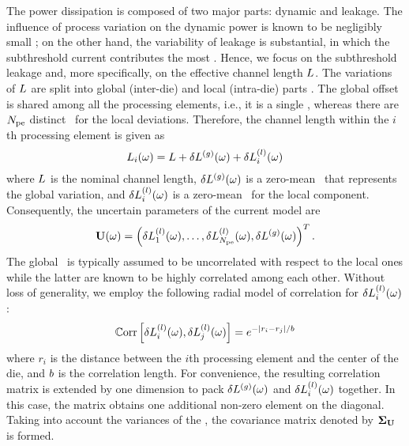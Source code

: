 The power dissipation is composed of two major parts: dynamic and leakage. The influence of process variation on the dynamic power is known to be negligibly small \cite{juan2011, juan2012, srivastava2010}; on the other hand, the variability of leakage is substantial, in which the subthreshold current contributes the most \cite{juan2011, juan2012}. Hence, we focus on the subthreshold leakage and, more specifically, on the effective channel length $L$. The variations of $L$ are split into global (inter-die) and local (intra-die) parts \cite{chandra2010, juan2011, juan2012, srivastava2010, shen2009}. The global offset is shared among all the processing elements, i.e., it is a single \rv, whereas there are ${N_\text{pe}}$ distinct \rvs\ for the local deviations. Therefore, the channel length within the $i$th processing element is given as
\[
  L_i(\omega) = L + {\delta L^{(g)}}(\omega) + \delta L^{(l)}_i(\omega)
\]
where $L$ is the nominal channel length, ${\delta L^{(g)}}(\omega)$ is a zero-mean \rv\ that represents the global variation, and $\delta L^{(l)}_i(\omega)$ is a zero-mean \rv\ for the local component. Consequently, the uncertain parameters of the current model are
\[
  \mathbf{U}(\omega) = \left(\delta L^{(l)}_1(\omega), \dotsc, \delta L^{(l)}_{N_\text{pe}}(\omega), {\delta L^{(g)}}(\omega) \right)^T.
\]
The global \rv\ is typically assumed to be uncorrelated with respect to the local ones while the latter are known to be highly correlated among each other. Without loss of generality, we employ the following radial model of correlation for $\delta L^{(l)}_i(\omega)$ \cite{ghanem1991, cheng2011}:
\begin{equation} \elabel{covariance-function}
  \oCorr{\lLeff_i(\o), \lLeff_j(\o)} = e^{-|r_i - r_j|/\corrLength}
\end{equation}
where $r_i$ is the distance between the $i$th processing element and the center of the die, and $b$ is the correlation length. For convenience, the resulting correlation matrix is extended by one dimension to pack ${\delta L^{(g)}}(\omega)$ and $\delta L^{(l)}_i(\omega)$ together. In this case, the matrix obtains one additional non-zero element on the diagonal. Taking into account the variances of the \rvs, the covariance matrix denoted by $\mCov_\vU$ is formed.
